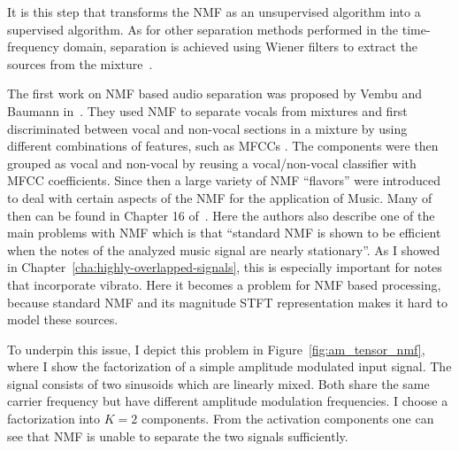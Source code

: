 It is this step that transforms the NMF as an unsupervised algorithm into a supervised algorithm.
As for other separation methods performed in the time-frequency domain, separation is achieved using Wiener filters to extract the sources from the mixture~\cite{liutkus15c}.
\par
The first work on NMF based audio separation was proposed by Vembu and Baumann in~\cite{vembu05}. 
They used NMF to separate vocals from mixtures and first discriminated between vocal and non-vocal sections in a mixture by using different combinations of features, such as MFCCs \cite{david80}. The components were then grouped as vocal and non-vocal by reusing a vocal/non-vocal classifier with MFCC coefficients.
Since then a large variety of NMF ``flavors'' were introduced to deal with certain aspects of the NMF for the application of Music. 
Many of then can be found in Chapter 16 of~\cite{vincent}.
Here the authors also describe one of the main problems with NMF which is that ``standard NMF is shown to be efficient when the notes of the analyzed music signal are nearly stationary''.
As I showed in Chapter~\ref{cha:highly-overlapped-signals}, this is especially important for notes that incorporate vibrato.
Here it becomes a problem for NMF based processing, because standard NMF and its magnitude STFT representation makes it hard to model these sources.
\par
To underpin this issue, I depict this problem in Figure~\ref{fig:am_tensor_nmf}, where I show the factorization of a simple amplitude modulated input signal. 
The signal consists of two sinusoids which are linearly mixed. 
Both share the same carrier frequency but have different amplitude modulation frequencies. 
I choose a factorization into $K=2$ components. 
From the activation components one can see that NMF is unable to separate the two signals sufficiently.
